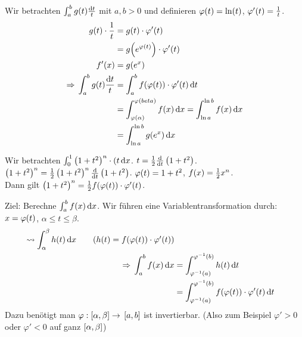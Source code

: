 \begin{beispiel}
    Wir betrachten $\int_{a}^{b} g\of{t} \frac{\dif t}{t}$ mit $a,b > 0$ und definieren $\varphi\of{t} = \ln\of{t}$, $\varphi'\of{t} = \frac{1}{t}$.
    \begin{align*}
        g\of{t}\cdot \frac{1}{t} &= g\of{t}\cdot\varphi'\of{t}\\
        &= g\of{e^{\varphi\of{t}}}\cdot\varphi'\of{t}\\
        f'\of{x} &= g\of{e^x}\\
        \impl \int_{a}^{b} g\of{t} \frac{\dif t}{t} &= \int_{a}^{b} f\of{\varphi\of{t}}\cdot\varphi'\of{t} \dif t\\
        &= \int_{\varphi\of{\alpha}}^{\varphi\of{beta}} f\of{x} \dif x = \int_{\ln a}^{\ln b} f\of{x} \dif x\\
        &= \int_{\ln a}^{\ln b} g\of{e^x} \dif x
    \end{align*}
\end{beispiel}

\begin{beispiel}
    Wir betrachten $ \int_{0}^{1} \left(1+t^2\right)^{n}\cdot (t \mathop{}\!\mathrm{d} x$. $t = \frac{1}{2}\frac{\mathop{}\!\mathrm{d}}{\mathop{}\!\mathrm{d} t}\left(1+t^2\right)$. $\left(1+t^2\right)^n = \frac{1}{2}\left(1+t^2\right)^n \frac{\mathop{}\!\mathrm{d}}{\mathop{}\!\mathrm{d} t}\left(1+t^2\right)$. $\varphi\of{t} = 1+t^2$, $f\of{x} = \frac{1}{2}x^n$.\\
    Dann gilt $\pair{1+t^2}^n = \frac{1}{2}f\of{\varphi\of{t}}\cdot\varphi'\of{t}$.
\end{beispiel}

\begin{genv}
    \marginnote{[10. Mai]}
    Ziel: Berechne $ \int_{a}^{b} f\of{x} \dif x$. Wir führen eine Variablentransformation durch: $x=\varphi\of{t}$, $\alpha \leq t \leq \beta$.
    \begin{align*}
        \leadsto \int_{\alpha}^{\beta} h\of{t} \dif x\tag{$h\of{t} = f\of{\varphi\of{t}}\cdot\varphi'\of{t}$}\\
        \impl \int_{a}^{b} f\of{x} \dif x &= \int_{\varphi^{-1}\of{a}}^{\varphi^{-1}\of{b}} h\of{t} \dif t\\
        &= \int_{\varphi^{-1}\of{a}}^{\varphi^{-1}\of{b}} f\of{\varphi\of{t}}\cdot\varphi'\of{t} \dif t
    \end{align*}
    Dazu benötigt man $\varphi: \left[\alpha, \beta\right]\rightarrow{}\left[a,b\right]$ ist invertierbar. (Also zum Beispiel $\varphi' > 0$ oder $\varphi' < 0$ auf ganz $\left[\alpha, \beta\right]$)
\end{genv}

